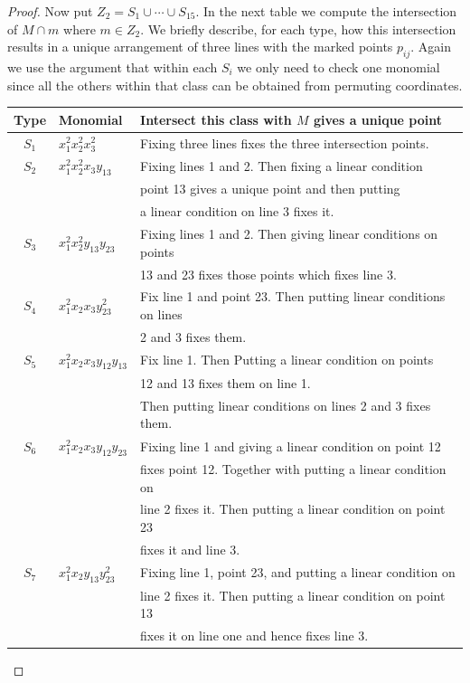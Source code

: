 \documentclass[12pt]{article}
\theoremstyle{plain}
\theoremstyle{definition}
\begin{document}
\begin{proof}
Now put $Z_2=S_1\cup \cdots \cup S_{15}$. In the next table we compute the intersection of $M\cap m$ where $m\in Z_2$. We briefly describe, for each type, how this intersection results in a unique arrangement of three lines with the marked points $p_{ij}$. Again we use the argument that within each $S_i$ we only need to check one monomial since all the others within that class can be obtained from permuting coordinates. 

\begin{longtable}{|c|l|l|}
\hline
Type &Monomial& Intersect this class with $M$ gives a unique point \\
\hline
\hline
$S_1$&$x_1^2x_2^2x_3^2$ &Fixing three lines fixes the three intersection points. \\
\hline
$S_2$ & $x_1^2x_2^2x_3y_{13}$ & Fixing lines 1 and 2. Then fixing a linear condition\\
&&  point 13 gives a unique point and then putting \\
&&a linear condition on line 3 fixes it.\\
\hline
$S_3$ & $x_1^2x_2^2y_{13}y_{23}$ & Fixing lines 1 and 2. Then giving linear conditions on points\\
&& 13 and 23 fixes those points which fixes line 3.\\
\hline
$S_4$ & $x_1^2x_2x_3y_{23}^2$ & Fix line 1 and point 23. Then putting linear conditions on lines \\
&& 2 and 3 fixes them.\\
\hline
$S_5$ & $x_1^2x_2x_3y_{12}y_{13}$ & Fix line 1. Then Putting a linear condition on points \\
&&12 and 13 fixes them on line 1. \\
&&Then putting linear conditions on lines 2 and 3 fixes them.\\
\hline
$S_6$ &$x_1^2x_2x_3y_{12}y_{23}$ & Fixing line 1 and giving a linear condition on point 12\\
&& fixes point 12. Together with putting a linear condition on\\
&& line 2 fixes it. Then putting a linear condition on point 23\\
&& fixes it and line 3.\\
\hline 
$S_7$ & $x_1^2x_2y_{13}y_{23}^2$ & Fixing line 1, point 23, and putting a linear condition on \\
&&line 2 fixes it. Then putting a linear condition on point 13\\
&& fixes it on line one and hence fixes line 3.\\

\end{longtable}
\end{proof}
\end{document}
